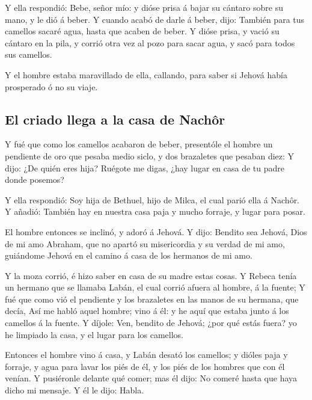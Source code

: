  Y ella respondió: Bebe, señor mío: y dióse prisa á bajar
su cántaro sobre su mano, y le dió á beber.  Y cuando acabó
de darle á beber, dijo: También para tus camellos sacaré agua, hasta que
acaben de beber.  Y dióse prisa, y vació su cántaro en la
pila, y corrió otra vez al pozo para sacar agua, y sacó para todos sus
camellos.

 Y el hombre estaba maravillado de ella, callando, para
saber si Jehová había prosperado ó no su viaje.

\hypertarget{el-criado-llega-a-la-casa-de-nachuxf4r}{%
\subsection{El criado llega a la casa de
Nachôr}\label{el-criado-llega-a-la-casa-de-nachuxf4r}}

 Y fué que como los camellos acabaron de beber, presentóle
el hombre un pendiente de oro que pesaba medio siclo, y dos brazaletes
que pesaban diez:  Y dijo: ¿De quién eres hija? Ruégote me
digas, ¿hay lugar en casa de tu padre donde posemos?

 Y ella respondió: Soy hija de Bethuel, hijo de Milca, el
cual parió ella á Nachôr.  Y añadió: También hay en nuestra
casa paja y mucho forraje, y lugar para posar.

 El hombre entonces se inclinó, y adoró á Jehová.
 Y dijo: Bendito sea Jehová, Dios de mi amo Abraham, que no
apartó su misericordia y su verdad de mi amo, guiándome Jehová en el
camino á casa de los hermanos de mi amo.

 Y la moza corrió, é hizo saber en casa de su madre estas
cosas.  Y Rebeca tenía un hermano que se llamaba Labán, el
cual corrió afuera al hombre, á la fuente;  Y fué que como
vió el pendiente y los brazaletes en las manos de su hermana, que decía,
Así me habló aquel hombre; vino á él: y he aquí que estaba junto á los
camellos á la fuente.  Y díjole: Ven, bendito de Jehová;
¿por qué estás fuera? yo he limpiado la casa, y el lugar para los
camellos.

 Entonces el hombre vino á casa, y Labán desató los
camellos; y dióles paja y forraje, y agua para lavar los piés de él, y
los piés de los hombres que con él venían.  Y pusiéronle
delante qué comer; mas él dijo: No comeré hasta que haya dicho mi
mensaje. Y él le dijo: Habla.

